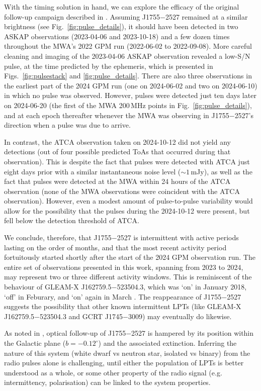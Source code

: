 \documentclass[fleqn,usenatbib]{mnras}
\newcommand{\src}{J1755$-$2527}
\newcommand{\Fig}{Fig.}
\newcommand{\Figs}{Figs.}
\begin{document}
With the timing solution in hand, we can explore the efficacy of the original follow-up campaign described in .
Assuming \src{} remained at a similar brightness (see \Fig~\ref{fig:pulse_details}), it should have been detected in two ASKAP observations (2023-04-06 and 2023-10-18) and a few dozen times throughout the MWA's 2022 GPM run (2022-06-02 to 2022-09-08).
More careful cleaning and imaging of the 2023-04-06 ASKAP observation revealed a low-S/N pulse, at the time predicted by the ephemeris, which is presented in \Figs~\ref{fig:pulsestack} and \ref{fig:pulse_details}.
There are also three observations in the earliest part of the 2024 GPM run (one on 2024-06-02 and two on 2024-06-10) in which no pulse was observed.
However, pulses were detected just ten days later on 2024-06-20 (the first of the MWA 200\,MHz points in \Fig~\ref{fig:pulse_details}), and at each epoch thereafter whenever the MWA was observing in \src{}'s direction when a pulse was due to arrive.

In contrast, the ATCA observation taken on 2024-10-12 did not yield any detections (out of four possible predicted ToAs that occurred during that observation).
This is despite the fact that pulses were detected with ATCA just eight days prior with a similar instantaneous noise level (${\sim}1\,$mJy), as well as the fact that pulses were detected at the MWA within 24 hours of the ATCA observation (none of the MWA observations were coincident with the ATCA observation).
However, even a modest amount of pulse-to-pulse variability would allow for the possibility that the pulses during the 2024-10-12 were present, but fell below the detection threshold of ATCA.

We conclude, therefore, that \src{} is intermittent with active periods lasting on the order of months, and that the most recent activity period fortuitously started shortly after the start of the 2024 GPM observation run.
The entire set of observations presented in this work, spanning from 2023 to 2024, may represent two or three different activity windows.
This is reminiscent of the behaviour of GLEAM-X J162759.5$-$523504.3, which was `on' in January 2018, `off' in Feburary, and `on' again in March \citep{2022Natur.601..526H}.
The reappearance of \src{} suggests the possibility that other known intermittent LPTs (like GLEAM-X J162759.5$-$523504.3 and GCRT J1745$-$3009) may eventually do likewise.

As noted in , optical follow-up of \src{} is hampered by its position within the Galactic plane ($b = -0.12^\circ$) and the associated extinction.
Inferring the nature of this system (white dwarf vs neutron star, isolated vs binary) from the radio pulses alone is challenging, until either the population of LPTs is better understood as a whole, or some other property of the radio signal (e.g. intermittency, polarisation) can be linked to the system properties.
\end{document}
